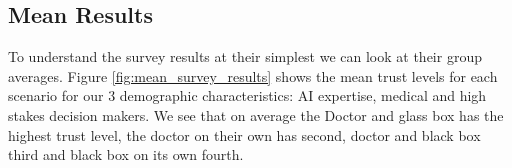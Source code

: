 \documentclass[manuscript,screen,review]{acmart}
\begin{document}






\subsection{Mean Results}

To understand the survey results at their simplest we can look at their group averages. Figure \ref{fig:mean_survey_results} shows the mean trust levels for each scenario for our 3 demographic characteristics: AI expertise, medical and high stakes decision makers. We see that on average the Doctor and glass box has the highest trust level, the doctor on their own has second, doctor and black box third and black box on its own fourth. 
\end{document}
